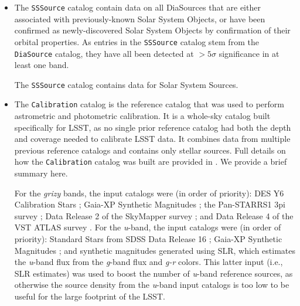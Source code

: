 \begin{itemize}
\item The \texttt{SSSource} catalog \citep{10.71929/rubin/2570333} contain data on all DiaSources that are either associated with previously-known Solar System Objects, or have been confirmed as newly-discovered Solar System Objects by confirmation of their orbital properties. 
As entries in the \texttt{SSSource} catalog stem from the \texttt{DiaSource} catalog, they have all been detected at $>5\sigma$ significance in at least one band.

The \texttt{SSSource} catalog contains data for \nsolarsystemsources Solar System Sources.



\item The \texttt{Calibration} catalog is the reference catalog that was used to perform astrometric and photometric \gls{calibration}. 
It is a whole-sky catalog built specifically for \gls{LSST}, as no single prior reference catalog had both the depth and coverage needed to calibrate \gls{LSST} data.
It combines data from multiple previous reference catalogs and contains only stellar sources.
Full details on how the \texttt{Calibration} catalog was built are provided in \cite{DMTN-277}. 
We provide a brief summary here.

For the \textit{grizy} bands, the input catalogs were (in order of priority): \gls{DES} Y6 Calibration Stars \citep{2023arXiv230501695R}; Gaia-\gls{XP} Synthetic Magnitudes \citep{2023A&A...674A..33G}; the \gls{Pan-STARRS}1 3pi survey \citep{2016arXiv161205560C}; \gls{Data Release} 2 of the  SkyMapper survey \citep{2019PASA...36...33O}; and \gls{Data Release} 4 of the \gls{VST} \gls{ATLAS} survey \citep{2015MNRAS.451.4238S}. 
For the \textit{u}-band, the input catalogs were (in order of priority): Standard Stars from \gls{SDSS} \gls{Data Release} 16 \citep{2020ApJS..249....3A}; Gaia-\gls{XP} Synthetic Magnitudes \citep{2023A&A...674A..33G}; and synthetic magnitudes generated using \gls{SLR}, which estimates the \textit{u}-band \gls{flux} from the \textit{g}-band \gls{flux} and \textit{g-r} colors. 
This latter input (i.e., \gls{SLR} estimates) was used to boost the number of \textit{u}-band reference sources, as otherwise the source density from the \textit{u}-band input catalogs is too low to be useful for the large footprint of the \gls{LSST}.


\end{itemize}
